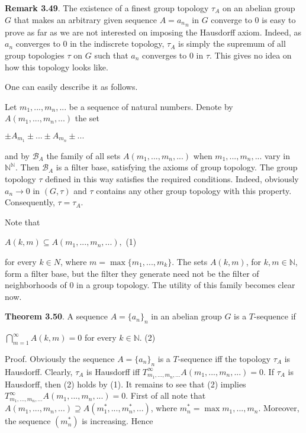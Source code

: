 \documentclass[12pt]{article}
\begin{document}
    \textbf{Remark 3.49}. The existence of a finest group topology $\tau_A$ on an abelian group $G$ that makes an arbitrary
    given sequence $A = {a_n}_n$ in $G$ converge to 0 is easy to prove as far as we are not interested on imposing the
    Hausdorff axiom. Indeed, as $a_n$ converges to 0 in the indiscrete topology, $\tau_A$ is simply the supremum of all
    group topologies $\tau$ on $G$ such that $a_n$ converges to 0 in $\tau$. This gives no idea on how this topology looks like.
    
    
    One can easily describe it as follows.
    
    
    Let $m_1, . . . , m_n, . . .$ be a sequence of natural numbers. Denote by $A(m_1, . . . , m_n, . . .)$ the set
    
    
    $\pm A_{m_1} ± . . . ± A_{m_n} \pm . . .$
    
    
    and by $\mathcal{B}_A$ the family of all sets $A(m_1, . . . , m_n, . . .)$ when $m_1, . . . , m_n, . . .$ vary in $\mathbb{N}^\mathbb{N}$. Then $\mathcal{B}_A$ is a filter
    base, satisfying the axioms of group topology. The group topology $\tau$ defined in this way satisfies the required
    conditions. Indeed, obviously $a_n \to 0$ in $(G, \tau)$ and $\tau$ contains any other group topology with this property.  
    Consequently, $\tau = \tau_A$.

    
    Note that


    $A(k, m) \subseteq A(m_1, . . . , m_n, . . .),$ (1)
    
    
    for every $k \in N$, where $m = \max \{m_1, . . . , m_k\}$. The sets $A(k, m)$, for $k, m \in \mathbb{N}$, form a filter base, but the
    filter they generate need not be the filter of neighborhoods of 0 in a group topology. The utility of this family
    becomes clear now.


    \textbf{Theorem 3.50}. A sequence $A = \{a_n\}_n$ in an abelian group $G$ is a $T$-sequence if


    $\bigcap^{\infty}_{m=1} A(k, m) = 0$ for every $k \in \mathbb{N}$. (2)


        Proof. Obviously the sequence $A = \{a_n\}_n$ is a $T$-sequence iff the topology $\tau_A$ is Hausdorff. Clearly, $\tau_A$ is
    Hausdorff iff $T^{\infty}_{m_1,...,m_n,...} A(m_1, . . . , m_n, . . .) = 0$. If $\tau_A$ is Hausdorff, then (2) holds by (1). It remains to see that
    (2) implies $T^{\infty}_{m_1,...,m_n,...} A(m_1, . . . , m_n, . . .) = 0$. First of all note that $A(m_1, . . . , m_n, . . .) \supseteq A(m^*_1, . . . , m^*_n, . . .)$,
    where $m^*_n = \max{m_1, . . . , m_n}$. Moreover, the sequence $(m^*_n)$ is increasing. Hence
\end{document}
